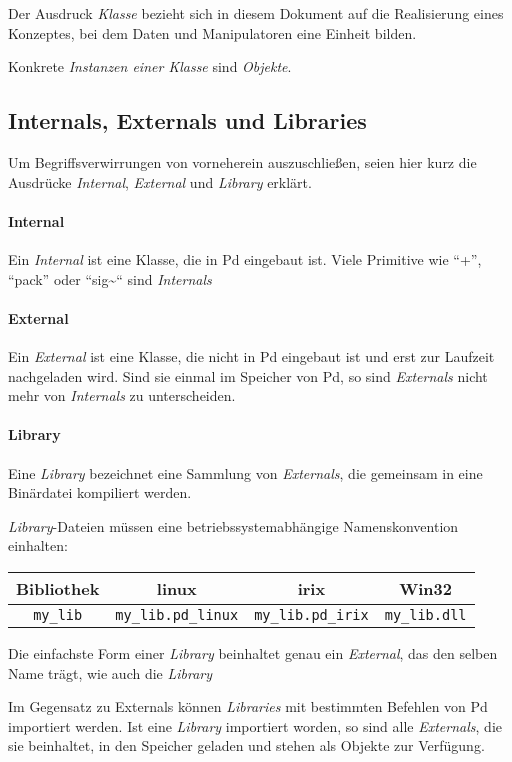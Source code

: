 \documentclass[12pt, a4paper,austrian, titlepage]{article}
\begin{document}
Der Ausdruck {\em Klasse} bezieht sich in diesem Dokument auf die Realisierung eines
Konzeptes, bei dem Daten und Manipulatoren eine Einheit bilden.

Konkrete {\em Instanzen einer Klasse} sind {\em Objekte}.

\subsection{Internals, Externals und Libraries}
Um Begriffsverwirrungen von vorneherein auszuschließen, seien hier kurz die Ausdrücke
{\em Internal}, {\em External} und {\em Library} erklärt.

\paragraph{Internal}
Ein {\em Internal} ist eine Klasse, die in Pd eingebaut ist.
Viele Primitive wie ``+'', ``pack'' oder ``sig\~\/`` sind {\em Internals}

\paragraph{External}
Ein {\em External} ist eine Klasse, die nicht in Pd eingebaut ist und erst zur Laufzeit
nachgeladen wird.
Sind sie einmal im Speicher von Pd, so sind {\em Externals} nicht mehr von {\em Internals} zu
unterscheiden.

\paragraph{Library}
Eine {\em Library} bezeichnet eine Sammlung von {\em Externals},
die gemeinsam in eine Binärdatei kompiliert werden.

{\em Library}-Dateien müssen eine betriebssystemabhängige Namenskonvention einhalten:

\begin{tabular}{c||c|c|c}
Bibliothek&linux&irix&Win32 \\
\hline
{\tt my\_lib}&{\tt  my\_lib.pd\_linux}&{\tt  my\_lib.pd\_irix}&
{\tt  my\_lib.dll}\\
\end{tabular}

Die einfachste Form einer {\em Library} beinhaltet genau ein {\em External},
das den selben Name trägt, wie auch die {\em Library}

Im Gegensatz zu Externals können {\em Libraries} mit bestimmten Befehlen
von Pd importiert werden.
Ist eine {\em Library} importiert worden,
so sind alle {\em Externals}, die sie beinhaltet,
in den Speicher geladen und stehen als Objekte zur Verfügung.
\end{document}
